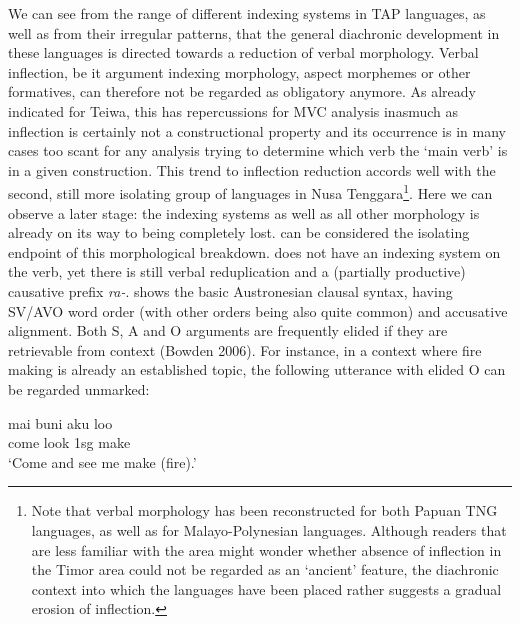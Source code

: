 We can see from the range of different indexing systems in TAP languages, as well as from their irregular patterns, that the general diachronic development in these languages is directed towards a reduction of verbal morphology. Verbal inflection, be it argument indexing morphology, aspect morphemes or other formatives, can therefore not be regarded as obligatory anymore. As already indicated for Teiwa, this has repercussions for MVC analysis inasmuch as inflection is certainly not a constructional property and its occurrence is in many cases too scant for any analysis trying to determine which verb the `main verb' is in a given construction. This trend to inflection reduction accords well with the second, still more isolating group of languages in Nusa Tenggara\footnote{Note that verbal morphology has been reconstructed for both Papuan TNG languages, as well as for Malayo-Polynesian languages. Although readers that are less familiar with the area might wonder whether absence of inflection in the Timor area could not be regarded as an `ancient' feature, the diachronic context into which the languages have been placed rather suggests a gradual erosion of inflection.}. Here we can observe a later stage: the indexing systems as well as all other morphology is already on its way to being completely lost.  can be considered the isolating endpoint of this morphological breakdown.  does not have an indexing system on the verb, yet there is still verbal reduplication and a (partially productive) causative prefix \textit{ra-}.  shows the basic Austronesian clausal syntax, having SV/AVO word order (with other orders being also quite common) and accusative alignment. Both S, A and O arguments are frequently elided if they are retrievable from context (Bowden 2006). For instance, in a context where fire making is already an established topic, the following utterance with elided O can be regarded unmarked:

\ea 
\gll mai buni aku loo \\
come look \acs{1}\acs{sg} make \\
\glft ‘Come and see me make (fire).’ \\ 
\z
\xe

